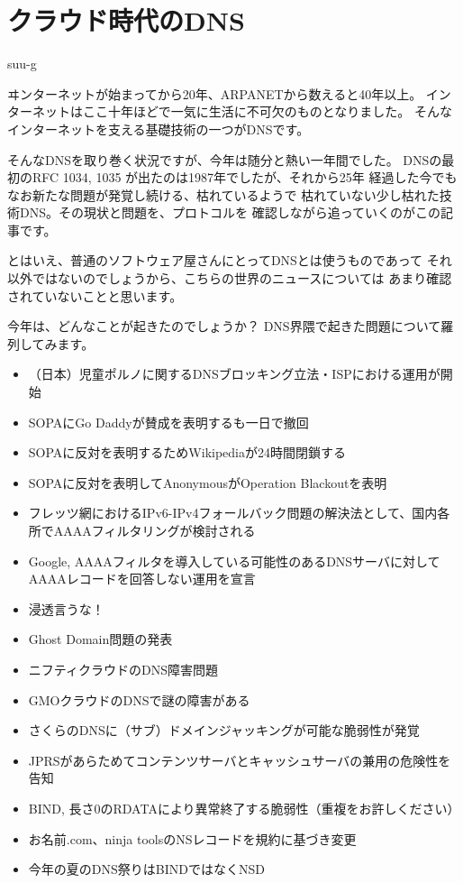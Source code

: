 
\cleardoublepage
\plainifnotempty

\chapter{クラウド時代のDNS}
\begin{flushright}
suu-g
\end{flushright}

\lettrine{ヰ}
ンターネットが始まってから20年、ARPANETから数えると40年以上。
インターネットはここ十年ほどで一気に生活に不可欠のものとなりました。
そんなインターネットを支える基礎技術の一つがDNSです。

そんなDNSを取り巻く状況ですが、今年は随分と熱い一年間でした。
DNSの最初のRFC 1034, 1035 が出たのは1987年でしたが、それから25年
経過した今でもなお新たな問題が発覚し続ける、枯れているようで
枯れていない少し枯れた技術DNS。その現状と問題を、プロトコルを
確認しながら追っていくのがこの記事です。

とはいえ、普通のソフトウェア屋さんにとってDNSとは使うものであって
それ以外ではないのでしょうから、こちらの世界のニュースについては
あまり確認されていないことと思います。

今年は、どんなことが起きたのでしょうか？
DNS界隈で起きた問題について羅列してみます。
\begin{itemize}
  \item （日本）児童ポルノに関するDNSブロッキング立法・ISPにおける運用が開始
  \item SOPAにGo Daddyが賛成を表明するも一日で撤回
  \item SOPAに反対を表明するためWikipediaが24時間閉鎖する
  \item SOPAに反対を表明してAnonymousがOperation Blackoutを表明
  \item フレッツ網におけるIPv6-IPv4フォールバック問題の解決法として、国内各所でAAAAフィルタリングが検討される
  \item Google, AAAAフィルタを導入している可能性のあるDNSサーバに対してAAAAレコードを回答しない運用を宣言
  \item 浸透言うな！
  \item Ghost Domain問題の発表
  \item ニフティクラウドのDNS障害問題
  \item GMOクラウドのDNSで謎の障害がある
  \item さくらのDNSに（サブ）ドメインジャッキングが可能な脆弱性が発覚
  \item JPRSがあらためてコンテンツサーバとキャッシュサーバの兼用の危険性を告知
  \item BIND, 長さ0のRDATAにより異常終了する脆弱性（重複をお許しください）
  \item お名前.com、ninja toolsのNSレコードを規約に基づき変更
  \item 今年の夏のDNS祭りはBINDではなくNSD
\end{itemize}

